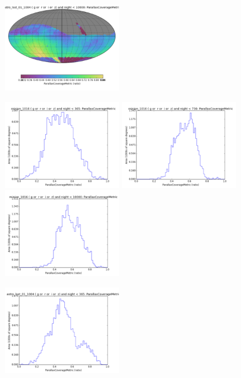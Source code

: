\begin{figure}[ht]
\begin{center}
  \includegraphics[width=2.0in]{./figs/milkyway/astromPanels/MW_Astrom_paCovge_wfdPlane_10y_map.png}
  \end{center}

  \begin{center}
  \includegraphics[width=2.0in]{./figs/milkyway/astromPanels/MW_Astrom_paCovge_Baseline_01y_hst.png}
  \includegraphics[width=2.0in]{./figs/milkyway/astromPanels/MW_Astrom_paCovge_Baseline_02y_hst.png}
  \includegraphics[width=2.0in]{./figs/milkyway/astromPanels/MW_Astrom_paCovge_Baseline_10y_hst.png}
  \end{center}
  \begin{center}
  \includegraphics[width=2.0in]{./figs/milkyway/astromPanels/MW_Astrom_paCovge_wfdPlane_01y_hst.png}

\end{center}
\end{figure}
